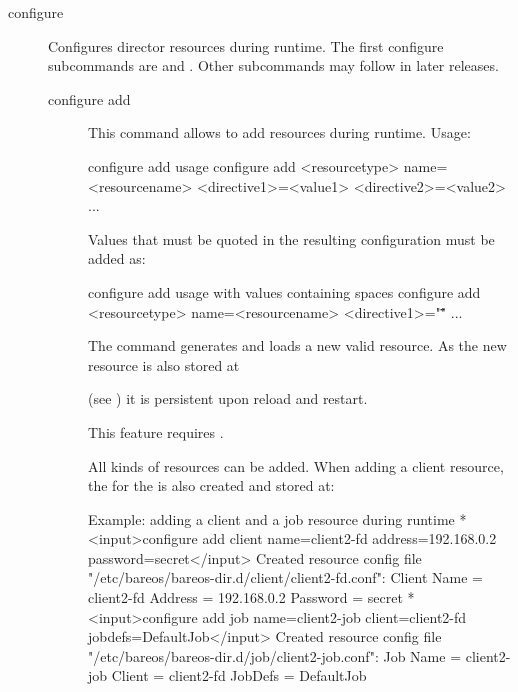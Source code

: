 \begin{description}
\item[configure]
    \label{sec:bcommandConfigure}

    Configures director resources during runtime.
    The first configure subcommands are  and .
    Other subcommands may follow in later releases.

    \begin{description}
    \item [configure add]
        \label{sec:bcommandConfigureAdd}

        This command allows to add resources during runtime.
        Usage:
\begin{bconsole}{configure add usage}
configure add <resourcetype> name=<resourcename> <directive1>=<value1> <directive2>=<value2> ...
\end{bconsole}

    Values that must be quoted in the resulting configuration must be added as:
\begin{bconsole}{configure add usage with values containing spaces}
configure add <resourcetype> name=<resourcename> <directive1>="\"<value containing spaces>\"" ...
\end{bconsole}

    The command generates and loads a new valid resource.
    As the new resource is also stored at


    (see ) it is persistent upon reload and restart.

    This feature requires .

    All kinds of resources can be added.
    When adding a client resource, the  for the \bareosFd is also created
    and stored at:


\begin{bconsole}{Example: adding a client and a job resource during runtime}
*<input>configure add client name=client2-fd address=192.168.0.2 password=secret</input>
Created resource config file "/etc/bareos/bareos-dir.d/client/client2-fd.conf":
Client {
  Name = client2-fd
  Address = 192.168.0.2
  Password = secret
}
*<input>configure add job name=client2-job client=client2-fd jobdefs=DefaultJob</input>
Created resource config file "/etc/bareos/bareos-dir.d/job/client2-job.conf":
Job {
  Name = client2-job
  Client = client2-fd
  JobDefs = DefaultJob
}
\end{bconsole}


\end{description}
\end{description}

